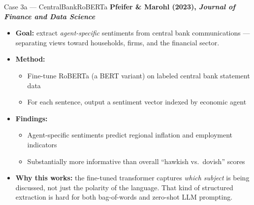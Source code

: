 \documentclass[10pt,english,aspectratio=169]{beamer}
\begin{document}
\begin{frame}{Case 3a --- CentralBankRoBERTa}
\textbf{Pfeifer \& Marohl (2023), \emph{Journal of Finance and Data Science}}

\medskip
\begin{itemize}
\item \textbf{Goal:} extract \emph{agent-specific} sentiments from central bank communications --- separating views toward households, firms, and the financial sector.

\medskip
\item \textbf{Method:}
\begin{itemize}
    \item Fine-tune RoBERTa (a BERT variant) on labeled central bank statement data
    \item For each sentence, output a sentiment vector indexed by economic agent
\end{itemize}

\medskip
\item \textbf{Findings:}
\begin{itemize}
    \item Agent-specific sentiments predict regional inflation and employment indicators
    \item Substantially more informative than overall ``hawkish vs.\ dovish'' scores
\end{itemize}

\medskip
\item \textbf{Why this works:} the fine-tuned transformer captures \emph{which subject} is being discussed, not just the polarity of the language. That kind of structured extraction is hard for both bag-of-words and zero-shot LLM prompting.
\end{itemize}
\end{frame}
\end{document}
